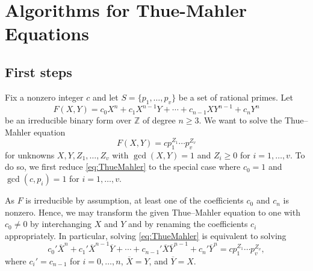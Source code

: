 
\chapter{Algorithms for Thue-Mahler Equations}
\label{ch:AlgorithmsForTM}




\section{First steps}
\label{sec:FirstSteps}

Fix a nonzero integer $c$ and let $S=\{p_1,\dotsc,p_v\}$ be a set of rational primes. Let
\[F(X,Y) = c_0 X^n + c_1 X^{n-1}Y + \cdots + c_{n-1}XY^{n-1} + c_nY^n\]
be an irreducible binary form over $\mathbb{Z}$ of degree $n \geq 3$. We want to solve the Thue--Mahler equation
\begin{equation} \label{eq:ThueMahler}
F(X,Y) = c p_1^{Z_1}\cdots p_v^{Z_v}
\end{equation}
for unknowns $X,Y, Z_1, \dots, Z_v$ with $\gcd(X,Y) = 1$ and $Z_i \geq 0$ for $i = 1,\dots, v$. To do so, we first reduce \eqref{eq:ThueMahler} to the special case where $c_0 = 1$ and $\gcd(c,p_i) = 1$ for $i = 1, \dots, v$. 

As $F$ is irreducible by assumption, at least one of the coefficients $c_0$ and $c_n$ is nonzero. Hence, we may transform the given Thue--Mahler equation to one with $c_0 \neq 0$ by interchanging $X$ and $Y$ and by renaming the coefficients $c_i$ appropriately. In particular, solving \eqref{eq:ThueMahler} is equivalent to solving 
\[ c_0' \overline{X}^n + c_1' \overline{X}^{n-1}\overline{Y} + \cdots + c_{n-1}'\overline{X}\overline{Y}^{n-1} + c_n'\overline{Y}^n = c p_1^{Z_1}\cdots p_v^{Z_v},\]
where $c_i' = c_{n-1}$ for $i = 0, \dots, n$, $\overline{X} = Y$, and $\overline{Y} = X$. 

